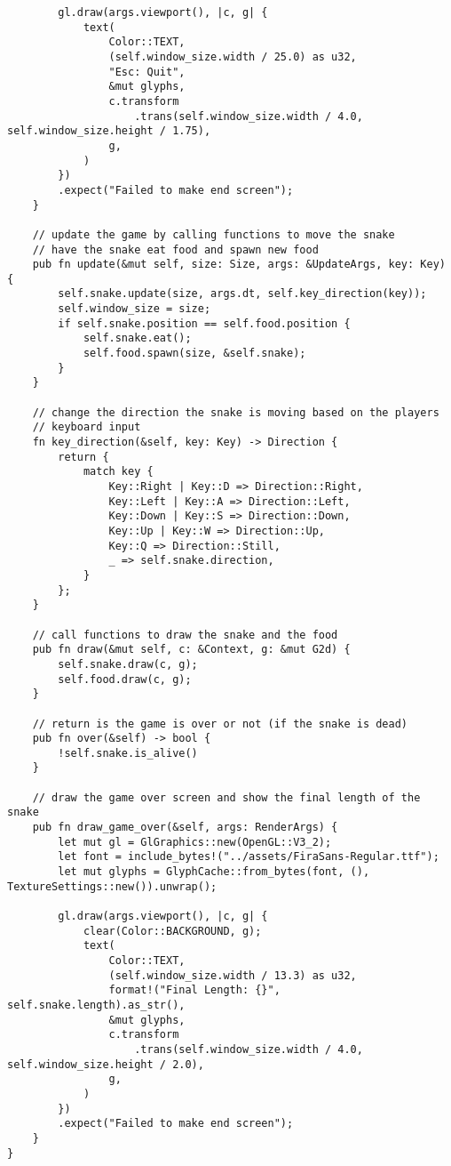 \documentclass{article}
\begin{document}
\begin{verbatim}
        gl.draw(args.viewport(), |c, g| {
            text(
                Color::TEXT,
                (self.window_size.width / 25.0) as u32,
                "Esc: Quit",
                &mut glyphs,
                c.transform
                    .trans(self.window_size.width / 4.0, self.window_size.height / 1.75),
                g,
            )
        })
        .expect("Failed to make end screen");
    }

    // update the game by calling functions to move the snake
    // have the snake eat food and spawn new food
    pub fn update(&mut self, size: Size, args: &UpdateArgs, key: Key) {
        self.snake.update(size, args.dt, self.key_direction(key));
        self.window_size = size;
        if self.snake.position == self.food.position {
            self.snake.eat();
            self.food.spawn(size, &self.snake);
        }
    }

    // change the direction the snake is moving based on the players
    // keyboard input
    fn key_direction(&self, key: Key) -> Direction {
        return {
            match key {
                Key::Right | Key::D => Direction::Right,
                Key::Left | Key::A => Direction::Left,
                Key::Down | Key::S => Direction::Down,
                Key::Up | Key::W => Direction::Up,
                Key::Q => Direction::Still,
                _ => self.snake.direction,
            }
        };
    }

    // call functions to draw the snake and the food
    pub fn draw(&mut self, c: &Context, g: &mut G2d) {
        self.snake.draw(c, g);
        self.food.draw(c, g);
    }

    // return is the game is over or not (if the snake is dead)
    pub fn over(&self) -> bool {
        !self.snake.is_alive()
    }

    // draw the game over screen and show the final length of the snake
    pub fn draw_game_over(&self, args: RenderArgs) {
        let mut gl = GlGraphics::new(OpenGL::V3_2);
        let font = include_bytes!("../assets/FiraSans-Regular.ttf");
        let mut glyphs = GlyphCache::from_bytes(font, (), TextureSettings::new()).unwrap();

        gl.draw(args.viewport(), |c, g| {
            clear(Color::BACKGROUND, g);
            text(
                Color::TEXT,
                (self.window_size.width / 13.3) as u32,
                format!("Final Length: {}", self.snake.length).as_str(),
                &mut glyphs,
                c.transform
                    .trans(self.window_size.width / 4.0, self.window_size.height / 2.0),
                g,
            )
        })
        .expect("Failed to make end screen");
    }
}
\end{verbatim}
\end{document}

